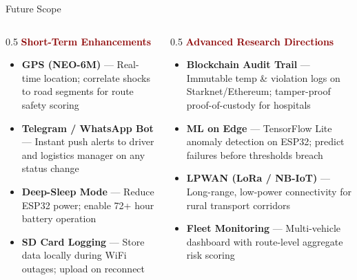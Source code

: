 \documentclass[aspectratio=169, 10pt]{beamer}
\begin{document}
\begin{frame}[shrink=2]{Future Scope}
  \begin{columns}[T]
    \begin{column}{0.5\textwidth}
      \textbf{\textcolor{darkred}{Short-Term Enhancements}}
      \begin{itemize}\setlength\itemsep{0.3em}
        \item \textbf{GPS (NEO-6M)} --- Real-time location; correlate shocks to road segments for route safety scoring
        \item \textbf{Telegram / WhatsApp Bot} --- Instant push alerts to driver and logistics manager on any status change
        \item \textbf{Deep-Sleep Mode} --- Reduce ESP32 power; enable 72+ hour battery operation
        \item \textbf{SD Card Logging} --- Store data locally during WiFi outages; upload on reconnect
      \end{itemize}
    \end{column}
    \begin{column}{0.5\textwidth}
      \textbf{\textcolor{darkred}{Advanced Research Directions}}
      \begin{itemize}\setlength\itemsep{0.3em}
        \item \textbf{Blockchain Audit Trail} --- Immutable temp \& violation logs on Starknet/Ethereum; tamper-proof proof-of-custody for hospitals
        \item \textbf{ML on Edge} --- TensorFlow Lite anomaly detection on ESP32; predict failures before thresholds breach
        \item \textbf{LPWAN (LoRa / NB-IoT)} --- Long-range, low-power connectivity for rural transport corridors
        \item \textbf{Fleet Monitoring} --- Multi-vehicle dashboard with route-level aggregate risk scoring
      \end{itemize}
    \end{column}
  \end{columns}
\end{frame}
\end{document}
